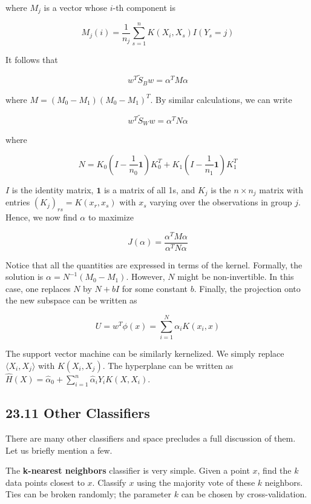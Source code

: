 where \(M_{j}\) is a vector whose \(i\)-th component is

\[ M_{j}(i) = \frac{1}{n_{j}} \sum_{s=1}^{n} K(X_{i}, X_s) I(Y_s = j) \]

It follows that

\[ w^T \tilde{S}_B w = \alpha^T M \alpha \]

where \(M = (M_{0} - M_{1})(M_{0} - M_{1})^T\). By similar calculations, we can
write

\[ w^T \tilde{S}_W w = \alpha^T N \alpha \]

where

\[ N = K_{0}\left( I - \frac{1}{n_{0}}\mathbf{1}\right) K_{0}^T + K_{1}\left( I - \frac{1}{n_{1}}\mathbf{1}\right) K_{1}^T\]

\(I\) is the identity matrix, \(\mathbf{1}\) is a matrix of all 1s, and
\(K_{j}\) is the \(n \times n_{j}\) matrix with entries
\((K_{j})_{rs} = K(x_r, x_s)\) with \(x_s\) varying over the observations
in group \(j\). Hence, we now find \(\alpha\) to maximize

\[ J(\alpha) = \frac{\alpha^T M \alpha}{\alpha^T N \alpha} \]

Notice that all the quantities are expressed in terms of the kernel.
Formally, the solution is \(\alpha = N^{-1}(M_{0} - M_{1})\). However, \(N\)
might be non-invertible. In this case, one replaces \(N\) by \(N + bI\)
for some constant \(b\). Finally, the projection onto the new subspace
can be written as

\[ U = w^T \phi(x) = \sum_{i=1}^N \alpha_{i} K(x_{i}, x) \]

The support vector machine can be similarly kernelized. We simply
replace \(\langle X_{i}, X_{j} \rangle\) with \(K(X_{i}, X_{j})\). The
hyperplane can be written as
\(\hat{H}(X) = \hat{\alpha}_{0} + \sum_{i=1}^{n} \hat{\alpha}_{i} Y_{i} K(X, X_{i})\).

\subsection*{23.11 Other Classifiers}\label{other-classifiers}

There are many other classifiers and space precludes a full discussion
of them. Let us briefly mention a few.

The \textbf{k-nearest neighbors} classifier is very simple. Given a
point \(x\), find the \(k\) data points closest to \(x\). Classify \(x\)
using the majority vote of these \(k\) neighbors. Ties can be broken
randomly; the parameter \(k\) can be chosen by cross-validation.

